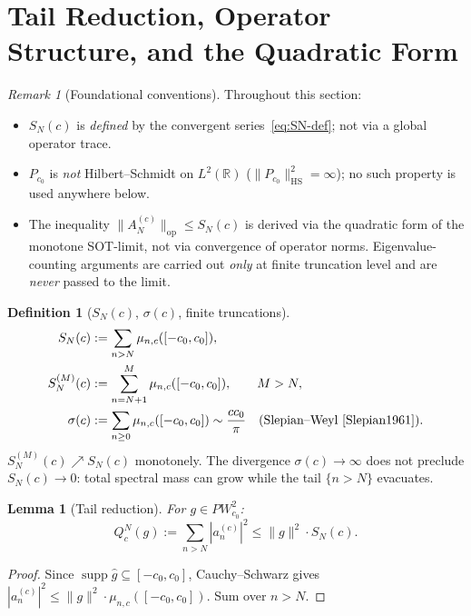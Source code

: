 \documentclass[12pt,a4paper]{amsart}
\newtheorem{lemma}[theorem]{Lemma}
\theoremstyle{definition}
\newtheorem{definition}[theorem]{Definition}
\theoremstyle{remark}
\newtheorem{remark}[theorem]{Remark}
\newcommand{\norm}[1]{\|#1\|}
\newcommand{\PW}{PW}
\newcommand{\Ac}{A_N^{(c)}}
\begin{document}
\section{Tail Reduction, Operator Structure, and the Quadratic Form}
\label{sec:tail}

\begin{remark}[Foundational conventions]
\label{rem:foundation}
Throughout this section:
\begin{itemize}[leftmargin=*]
\item $S_N(c)$ is \emph{defined} by the
  convergent series~\eqref{eq:SN-def};
  not via a global operator trace.
\item $P_{c_0}$ is \emph{not}
  Hilbert--Schmidt on $L^2(\mathbb{R})$
  ($\|P_{c_0}\|_{\mathrm{HS}}^2=\infty$);
  no such property is used anywhere below.
\item The inequality
  $\norm{\Ac}_{\mathrm{op}}\le S_N(c)$
  is derived via the quadratic form of
  the monotone SOT-limit, not via
  convergence of operator norms.
  Eigenvalue-counting arguments are
  carried out \emph{only} at finite
  truncation level and are \emph{never}
  passed to the limit.
\end{itemize}
\end{remark}

\begin{definition}[$S_N(c)$, $\sigma(c)$,
  finite truncations]
\label{def:SN}
\begin{align*}
  S_N(c) &:= \sum_{n>N}\mu_{n,c}([-c_0,c_0]),\\
  S_N^{(M)}(c) &:= \sum_{n=N+1}^{M}
            \mu_{n,c}([-c_0,c_0]),
            \qquad M>N,\\
  \sigma(c) &:= \sum_{n\ge 0}\mu_{n,c}([-c_0,c_0])
            \sim \frac{cc_0}{\pi}
            \quad\text{(Slepian--Weyl
            \cite{Slepian1961})}.
\end{align*}
$S_N^{(M)}(c)\nearrow S_N(c)$ monotonely.
The divergence $\sigma(c)\to\infty$
does not preclude $S_N(c)\to 0$:
total spectral mass can grow while the
tail $\{n>N\}$ evacuates.
\end{definition}

\begin{lemma}[Tail reduction]
\label{lem:tail}
For $g\in\PW_{c_0}^2$:
\[
  Q_c^N(g):=\sum_{n>N}|a_n^{(c)}|^2
  \le\norm{g}^2\cdot S_N(c).
\]
\end{lemma}
\begin{proof}
Since $\operatorname{supp}\hat g\subseteq[-c_0,c_0]$,
Cauchy--Schwarz gives
$|a_n^{(c)}|^2
\le\norm{g}^2\cdot\mu_{n,c}([-c_0,c_0])$.
Sum over $n>N$.
\end{proof}
\end{document}
